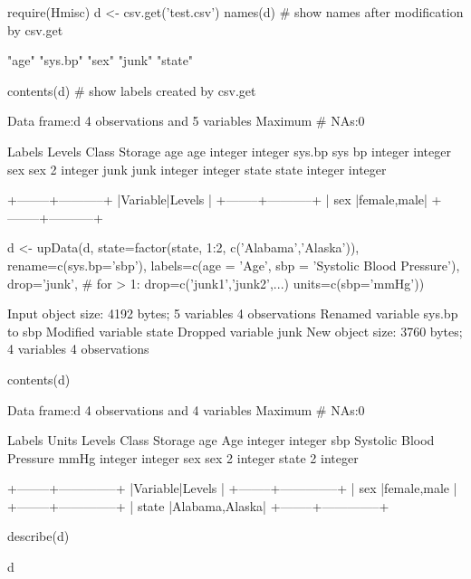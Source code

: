 \begin{Schunk}
\begin{Sinput}
require(Hmisc)
d <- csv.get('test.csv')
names(d)   # show names after modification by csv.get
\end{Sinput}
\begin{Soutput}
[1] "age"    "sys.bp" "sex"    "junk"   "state" 
\end{Soutput}
\begin{Sinput}
contents(d)  # show labels created by csv.get
\end{Sinput}
\begin{Soutput}

Data frame:d	4 observations and 5 variables    Maximum # NAs:0


       Labels Levels   Class Storage
age       age        integer integer
sys.bp sys bp        integer integer
sex       sex      2         integer
junk     junk        integer integer
state   state        integer integer

+--------+-----------+
|Variable|Levels     |
+--------+-----------+
|   sex  |female,male|
+--------+-----------+
\end{Soutput}
\begin{Sinput}
d <- upData(d,
            state=factor(state, 1:2, c('Alabama','Alaska')),
            rename=c(sys.bp='sbp'),
            labels=c(age = 'Age',
                     sbp = 'Systolic Blood Pressure'),
            drop='junk',   # for > 1: drop=c('junk1','junk2',...)
   units=c(sbp='mmHg'))
\end{Sinput}
\begin{Soutput}
Input object size:	 4192 bytes;	 5 variables	 4 observations
Renamed variable	 sys.bp 	to sbp 
Modified variable	state
Dropped variable	junk
New object size:	3760 bytes;	4 variables	4 observations
\end{Soutput}
\begin{Sinput}
contents(d)
\end{Sinput}
\begin{Soutput}

Data frame:d	4 observations and 4 variables    Maximum # NAs:0


                       Labels Units Levels   Class Storage
age                       Age              integer integer
sbp   Systolic Blood Pressure  mmHg        integer integer
sex                       sex            2         integer
state                                    2         integer

+--------+--------------+
|Variable|Levels        |
+--------+--------------+
|  sex   |female,male   |
+--------+--------------+
|  state |Alabama,Alaska|
+--------+--------------+
\end{Soutput}
\begin{Sinput}
describe(d)
\end{Sinput}
\begin{Soutput}
d 


\end{Soutput}
\end{Schunk}
